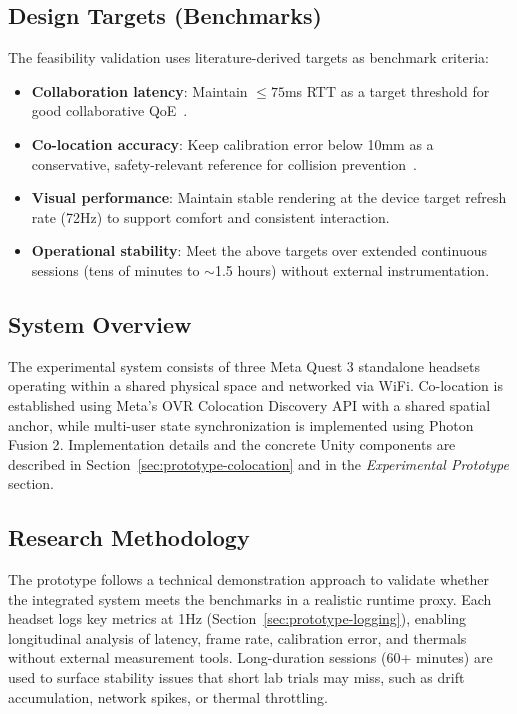 \subsection{Design Targets (Benchmarks)}
The feasibility validation uses literature-derived targets as benchmark criteria:
\begin{itemize}
    \item \textbf{Collaboration latency}: Maintain $\leq 75$ms RTT as a target threshold for good collaborative QoE~\cite{VanDammeSam2024Iolo}.
    \item \textbf{Co-location accuracy}: Keep calibration error below 10mm as a conservative, safety-relevant reference for collision prevention~\cite{ReimerDennis2021CfSV}.
    \item \textbf{Visual performance}: Maintain stable rendering at the device target refresh rate (72Hz) to support comfort and consistent interaction.
    \item \textbf{Operational stability}: Meet the above targets over extended continuous sessions (tens of minutes to $\sim$1.5 hours) without external instrumentation.
\end{itemize}

\subsection{System Overview}
The experimental system consists of three Meta Quest 3 standalone headsets operating within a shared physical space and networked via WiFi. Co-location is established using Meta's OVR Colocation Discovery API\cite{MetaColocationDiscovery2025} with a shared spatial anchor\cite{MetaSharedSpatialAnchors2025}, while multi-user state synchronization is implemented using Photon Fusion 2\cite{PhotonFusionDocs,MetaMultiplayerBuildingBlocks2025}. Implementation details and the concrete Unity components are described in Section~\ref{sec:prototype-colocation} and in the \textit{Experimental Prototype} section.


\subsection{Research Methodology}
The prototype follows a technical demonstration approach to validate whether the integrated system meets the benchmarks in a realistic runtime proxy. Each headset logs key metrics at 1Hz (Section~\ref{sec:prototype-logging}), enabling longitudinal analysis of latency, frame rate, calibration error, and thermals without external measurement tools. Long-duration sessions (60+ minutes) are used to surface stability issues that short lab trials may miss, such as drift accumulation, network spikes, or thermal throttling.

